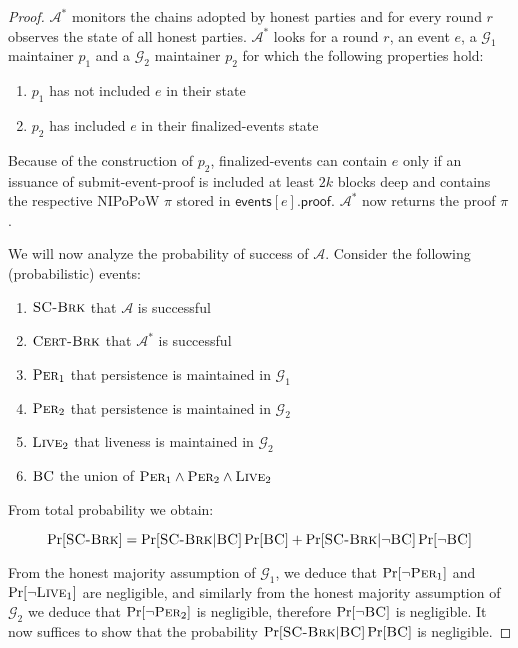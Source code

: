 \begin{proof}
  $\mathcal{A}^*$ monitors the chains adopted by honest parties and for every
  round $r$ observes the state of all honest parties. $\mathcal{A}^*$ looks for
  a round $r$, an event $e$, a $\mathcal{G}_1$ maintainer $p_1$ and a
  $\mathcal{G}_2$ maintainer $p_2$ for which the following properties hold:

  \begin{enumerate}
    \item $p_1$ has not included $e$ in their state
    \item $p_2$ has included $e$ in their \textsf{finalized-events} state
  \end{enumerate}

  Because of the construction of $p_2$, \textsf{finalized-events} can contain
  $e$ only if an issuance of \textsf{submit-event-proof} is included at least
  $2k$ blocks deep and contains the respective NIPoPoW $\pi$ stored in
  $\textsf{events}[e].\textsf{proof}$. $\mathcal{A}^*$ now returns the proof
  $\pi$.

  We will now analyze the probability of success of $\mathcal{A}$. Consider
  the following (probabilistic) events:

  \begin{enumerate}
    \item $\textsc{SC-Brk}$ that $\mathcal{A}$ is successful
    \item $\textsc{Cert-Brk}$ that $\mathcal{A}^*$ is successful
    \item $\textsc{Per}_1$ that persistence is maintained in $\mathcal{G}_1$
    \item $\textsc{Per}_2$ that persistence is maintained in $\mathcal{G}_2$
    \item $\textsc{Live}_2$ that liveness is maintained in $\mathcal{G}_2$
    \item $\textsc{BC}$ the union of $\textsc{Per}_1 \land \textsc{Per}_2 \land \textsc{Live}_2$
  \end{enumerate}

  From total probability we obtain:

  \[
  \Pr[\textsc{SC-Brk}] = \Pr[\textsc{SC-Brk}|\textsc{BC}]\Pr[\textsc{BC}]
                       + \Pr[\textsc{SC-Brk}|\lnot \textsc{BC}]\Pr[\lnot \textsc{BC}]
  \]

  From the honest majority assumption of $\mathcal{G}_1$, we deduce that
  $\Pr[\lnot \textsc{Per}_1]$ and $\Pr[\lnot \textsc{Live}_1]$ are negligible,
  and similarly from the honest majority assumption of $\mathcal{G}_2$ we deduce
  that $\Pr[\lnot \textsc{Per}_2]$ is negligible, therefore
  $\Pr[\lnot \textsc{BC}]$ is negligible. It now suffices to show that
  the probability $\Pr[\textsc{SC-Brk}|\textsc{BC}]\Pr[\textsc{BC}]$ is negligible.


\end{proof}
